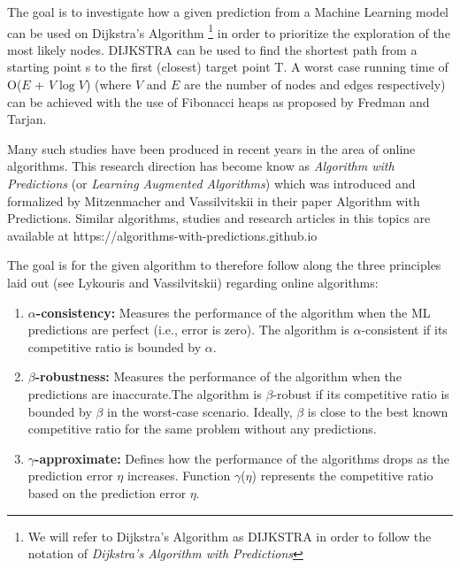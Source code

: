 The goal is to investigate how a given prediction from a Machine Learning model can be used on Dijkstra's Algorithm\cite{dijkstraNoteTwoProblems1959}
\footnote{We will refer to Dijkstra's Algorithm as \textsc{DIJKSTRA} in order to follow the notation of \textit{Dijkstra's Algorithm with Predictions}\cite{feijenDijkstrasAlgorithmPredictions2023}}
in order to prioritize the exploration of the most likely nodes. 
\textsc{DIJKSTRA} can be used to find the shortest path from a starting point s to the first (closest) target point T.
A worst case running time of O($E$ + $V\log V$) (where $V$ and $E$ are the number of nodes and edges respectively) 
can be achieved with the use of Fibonacci heaps as proposed by Fredman and Tarjan\cite{fredmanFibonacciHeapsTheir1987}.

Many such studies have been produced in recent years in the area of online algorithms. This research direction has become know as \textit{Algorithm with Predictions} (or \textit{Learning Augmented Algorithms})
which was introduced and formalized by Mitzenmacher and Vassilvitskii in their paper Algorithm with Predictions\cite{mitzenmacherAlgorithmsPredictions2020}.
Similar algorithms, studies and research articles in this topics are available at https://algorithms-with-predictions.github.io

The goal is for the given algorithm to therefore follow along the three principles laid out (see Lykouris and Vassilvitskii\cite{lykourisCompetitiveCachingMachine2021}) regarding online algorithms: 

\begin{enumerate}
\item \textbf{$\alpha$-consistency:}  Measures the performance of the algorithm when the ML predictions are perfect (i.e., error is zero). The algorithm is $\alpha$-consistent if its competitive ratio is bounded by $\alpha$.
\item \textbf{$\beta$-robustness:} Measures the performance of the algorithm when the predictions are inaccurate.The algorithm is $\beta$-robust if its competitive ratio is bounded by $\beta$ in the worst-case scenario. Ideally, $\beta$ is close to the best known competitive ratio for the same problem without any predictions.
\item \textbf{$\gamma$-approximate:} Defines how the performance of the algorithms drops as the prediction error $\eta$ increases. Function $\gamma$($\eta$) represents the competitive ratio based on the prediction error $\eta$.
\end{enumerate}

